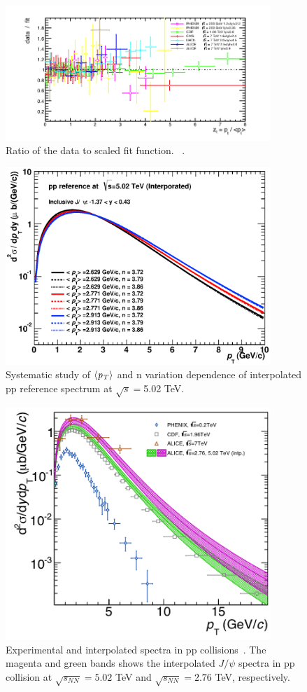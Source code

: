 \begin{figure}[!h]
  \centering
  \includegraphics[width=10cm]{chap4/figure/ppref/datatofit.png}
  \caption{Ratio of the data to scaled fit function. ~\cite{bib_jpsippref}. 
  }
  \label{fig_4_ppfit}
\end{figure}
\begin{figure}[!h]
  \centering
  \includegraphics[width=10cm]{chap4/figure/ppref/ppref5TeV_uncorrsys.eps}
  \caption{Systematic study of $\langle \it{p}_{T}\rangle$ and n variation dependence of interpolated pp reference spectrum at $\sqrt{s}=$5.02 TeV. }
  \label{fig_4_ppref}
\end{figure}
\begin{figure}[!h]
  \centering
  \includegraphics[width=10cm]{chap4/figure/ppref/ppspectra.png}
  \caption{Experimental and interpolated spectra in pp collisions~\cite{bib_jpsippref}. The magenta and green bands shows the interpolated $J/\psi$ spectra in pp collision at $\sqrt{s_{NN}}=5.02$ TeV and $\sqrt{s_{NN}}=2.76$ TeV, respectively.}
  \label{fig_4_ppref}
\end{figure}

